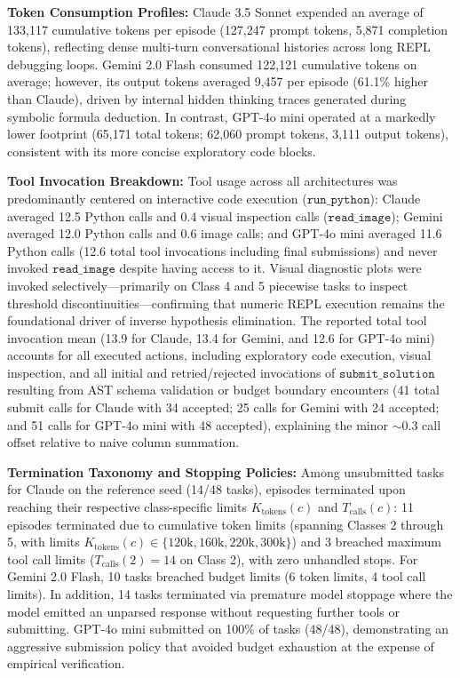 \documentclass[sigconf]{acmart}
\begin{document}
\noindent\textbf{Token Consumption Profiles:} Claude 3.5 Sonnet expended an average of 133,117 cumulative tokens per episode (127,247 prompt tokens, 5,871 completion tokens), reflecting dense multi-turn conversational histories across long REPL debugging loops. Gemini 2.0 Flash consumed 122,121 cumulative tokens on average; however, its output tokens averaged 9,457 per episode (61.1\% higher than Claude), driven by internal hidden thinking traces generated during symbolic formula deduction. In contrast, GPT-4o mini operated at a markedly lower footprint (65,171 total tokens; 62,060 prompt tokens, 3,111 output tokens), consistent with its more concise exploratory code blocks.

\noindent\textbf{Tool Invocation Breakdown:} Tool usage across all architectures was predominantly centered on interactive code execution ($\texttt{run\_python}$): Claude averaged 12.5 Python calls and 0.4 visual inspection calls ($\texttt{read\_image}$); Gemini averaged 12.0 Python calls and 0.6 image calls; and GPT-4o mini averaged 11.6 Python calls (12.6 total tool invocations including final submissions) and never invoked $\texttt{read\_image}$ despite having access to it. Visual diagnostic plots were invoked selectively—primarily on Class 4 and 5 piecewise tasks to inspect threshold discontinuities—confirming that numeric REPL execution remains the foundational driver of inverse hypothesis elimination. The reported total tool invocation mean (13.9 for Claude, 13.4 for Gemini, and 12.6 for GPT-4o mini) accounts for all executed actions, including exploratory code execution, visual inspection, and all initial and retried/rejected invocations of $\texttt{submit\_solution}$ resulting from AST schema validation or budget boundary encounters (41 total submit calls for Claude with 34 accepted; 25 calls for Gemini with 24 accepted; and 51 calls for GPT-4o mini with 48 accepted), explaining the minor $\sim 0.3$ call offset relative to naive column summation.

\noindent\textbf{Termination Taxonomy and Stopping Policies:} Among unsubmitted tasks for Claude on the reference seed (14/48 tasks), episodes terminated upon reaching their respective class-specific limits $K_{\text{tokens}}(c)$ and $T_{\text{calls}}(c)$: 11 episodes terminated due to cumulative token limits (spanning Classes 2 through 5, with limits $K_{\text{tokens}}(c) \in \{120\text{k}, 160\text{k}, 220\text{k}, 300\text{k}\}$) and 3 breached maximum tool call limits ($T_{\text{calls}}(2) = 14$ on Class 2), with zero unhandled stops. For Gemini 2.0 Flash, 10 tasks breached budget limits (6 token limits, 4 tool call limits). In addition, 14 tasks terminated via premature model stoppage where the model emitted an unparsed response without requesting further tools or submitting. GPT-4o mini submitted on 100\% of tasks (48/48), demonstrating an aggressive submission policy that avoided budget exhaustion at the expense of empirical verification.
\end{document}
